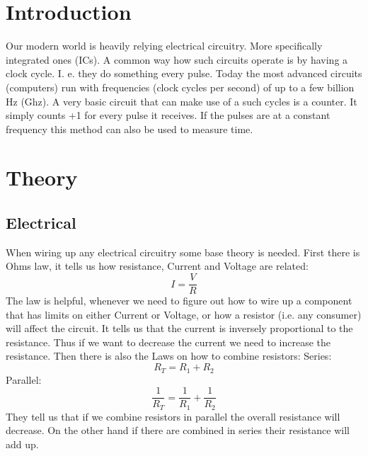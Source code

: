 \documentclass[fleqn,11pt]{article}
\begin{document}


\section{Introduction}
Our modern world is heavily relying electrical circuitry. More specifically integrated ones (ICs).
A common way how such circuits operate is by having a clock cycle. I. e. they do something every pulse.
Today the most advanced circuits (computers) run with frequencies (clock cycles per second) of up to
a few billion Hz (Ghz). A very basic circuit that can make use of a such cycles is a counter.
It simply counts +1 for every
pulse it receives. If the pulses are at a constant frequency this method can also be used to measure time.

\section{Theory}
\subsection{Electrical}

When wiring up any electrical circuitry some base theory is needed. First there is Ohms law,
it tells us how resistance,
Current and Voltage are related:
$$
I = \frac{V}{R}
$$
The law is helpful, whenever we need to figure out how to wire up a component that has limits
on either Current or Voltage,
or how a resistor (i.e. any consumer) will affect the circuit. It tells us that the current
is inversely proportional to the resistance. Thus if we want to decrease the current we need
to increase the resistance.
Then there is also the Laws on how to combine resistors:
\newline
\newline
Series:
$$
R_T = R_1 + R_2
$$
Parallel:
$$
\frac{1}{R_T} = \frac{1}{R_1} + \frac{1}{R_2}
$$
They tell us that if we combine resistors in parallel the overall resistance will decrease.
On the other hand if there are combined in series their resistance will add up.
\end{document}
